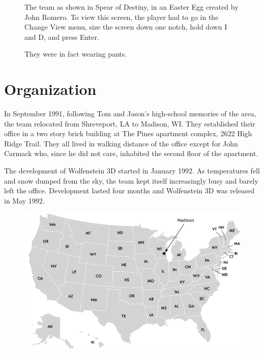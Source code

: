 \documentclass[book.tex]{subfiles}
\begin{document}
 \vspace{-10pt}
\begin{figure}[H]
\centering
      \caption{The team as shown in Spear of Destiny, in an Easter Egg created by John Romero. To view this screen, the player had to go in the Change View menu, size the screen down one notch, hold down I and D, and press Enter.}
\label{fig:id_team_1993}
\end{figure}


\begin{figure}[H]
\centering
  
    
\caption{They were in fact wearing pants.}
\label{fig:id_team_1993}
\end{figure}

\section{Organization}

In September 1991, following Tom and Jason's high-school memories of the area, the team relocated from Shreveport, LA to Madison, WI. They established their office in a two story brick building at The Pines apartment complex, 2622 High Ridge Trail. They all lived in walking distance of the office except for John Carmack who, since he did not care, inhabited the second floor of the apartment.\\
\par
The development of Wolfenstein 3D started in January 1992. As temperatures fell and snow dumped from the sky, the team kept itself increasingly busy and barely left the office. Development lasted four months and Wolfenstein 3D was released in May 1992.\\




\begin{figure}[H]
\centering
 \includegraphics[width=\textwidth]{imgs/drawings/map/usa-id-software.eps}
 \end{figure}
\end{document}
